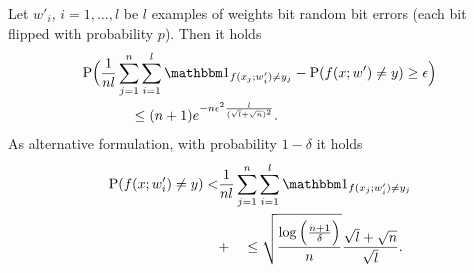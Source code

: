 \begin{proposition}
	\label{prop:bound}
	Let $w'_i$, $i = 1,\ldots,l$ be $l$ examples of weights bit random bit errors (each bit flipped with probability $p$). Then it holds
	\begin{align*}
		\Pr\Big( \frac{1}{nl}&\sum_{j=1}^n \sum_{i=1}^l \Id_{f(x_j;w'_i)\neq y_j} - \Pr(f(x;w')\neq y)\geq \epsilon\Big)\\
		&\quad\leq (n+1) e^{-n\epsilon^2 \frac{l}{(\sqrt{l}+\sqrt{n})^2}}.
	\end{align*}
	As alternative formulation, with probability $1-\delta$ it holds
	\begin{align*}
		\Pr( f(x; w'_i)\neq y) < & \frac{1}{nl}\sum_{j=1}^n \sum_{i=1}^l \Id_{f(x_j; w'_i)\neq y_j}\\ &+ \quad \leq\sqrt{\frac{\log\Big(\frac{n+1}{\delta}\Big)}{n}} \frac{\sqrt{l}+\sqrt{n}}{\sqrt{l}}.
	\end{align*} 
\end{proposition}

